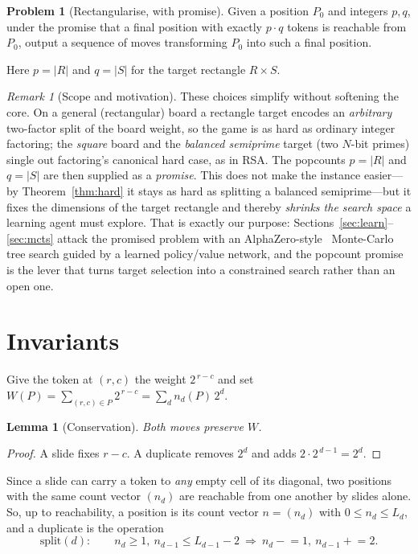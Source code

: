 \documentclass[11pt]{article}
\theoremstyle{definition}
\newtheorem{problem}{Problem}
\theoremstyle{plain}
\newtheorem{lemma}{Lemma}
\theoremstyle{remark}
\newtheorem{remark}{Remark}
\begin{document}
\begin{problem}[Rectangularise, with promise]\label{prob}
Given a position $P_0$ and integers $p,q$, under the promise that a final position
with exactly $p\cdot q$ tokens is reachable from $P_0$, output a sequence of moves
transforming $P_0$ into such a final position.
\end{problem}

Here $p=|R|$ and $q=|S|$ for the target rectangle $R\times S$.

\begin{remark}[Scope and motivation]
These choices simplify without softening the core. On a general (rectangular) board a
rectangle target encodes an \emph{arbitrary} two-factor split of the board weight, so the
game is as hard as ordinary integer factoring; the \emph{square} board and the
\emph{balanced semiprime} target (two $N$-bit primes) single out factoring's canonical hard
case, as in RSA. The popcounts $p=|R|$ and $q=|S|$ are then supplied as a \emph{promise}.
This does not make the instance easier---by Theorem~\ref{thm:hard} it stays as hard as
splitting a balanced semiprime---but it fixes the dimensions of the target rectangle and
thereby \emph{shrinks the search space} a learning agent must explore. That is exactly our
purpose: Sections~\ref{sec:learn}--\ref{sec:mcts} attack the promised problem with an
AlphaZero-style~\cite{alphazero} Monte-Carlo tree search guided by a learned policy/value
network, and the
popcount promise is the lever that turns target selection into a constrained search rather
than an open one.
\end{remark}

\section{Invariants}\label{sec:inv}

Give the token at $(r,c)$ the weight $2^{\,r-c}$ and set
$W(P)=\sum_{(r,c)\in P}2^{\,r-c}=\sum_d n_d(P)\,2^{d}$.

\begin{lemma}[Conservation]\label{lem:W}
Both moves preserve $W$.
\end{lemma}
\begin{proof}
A slide fixes $r-c$.  A duplicate removes $2^{d}$ and adds $2\cdot 2^{\,d-1}=2^{d}$.
\end{proof}

Since a slide can carry a token to \emph{any} empty cell of its diagonal, two
positions with the same count vector $(n_d)$ are reachable from one another by
slides alone.  So, up to reachability, a position is its count vector
$n=(n_d)$ with $0\le n_d\le L_d$, and a duplicate is the operation
\[
\mathrm{split}(d):\qquad n_d\ge 1,\ n_{d-1}\le L_{d-1}-2
\ \Longrightarrow\ n_d\mathrel{-}=1,\ n_{d-1}\mathrel{+}=2 .
\]
\end{document}
